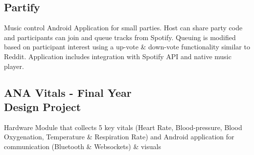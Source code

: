 \documentclass[a4paper]{resume}
\begin{document}
\begin{minipage}[t]{0.33\textwidth}




\subsection{Partify}

Music control Android Application for small parties. Host can share party code and participants can join and queue tracks from Spotify. Queuing is modified based on participant interest using a up-vote \& down-vote functionality similar to Reddit. Application includes integration with Spotify API and native music player.
\sectionsep

\subsection{ANA Vitals - Final Year \\
Design Project}

Hardware Module that collects 5 key vitals (Heart Rate, Blood-pressure, Blood Oxygenation, Temperature \& Respiration Rate) and Android application for communication (Bluetooth \& Websockets) \& visuals 


\end{minipage} 
\hfill
\end{document}
